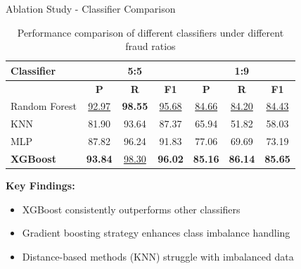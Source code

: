 \documentclass{beamer}
\begin{document}
\begin{frame}{Ablation Study - Classifier Comparison}
    \begin{table}
        \centering
        \tiny
        \caption{Performance comparison of different classifiers under different fraud ratios}
        \begin{tabular}{lccc|ccc}
            \hline
            \textbf{Classifier} & \multicolumn{3}{c|}{\textbf{5:5}} & \multicolumn{3}{c}{\textbf{1:9}} \\
            \hline
             & \textbf{P} & \textbf{R} & \textbf{F1} & \textbf{P} & \textbf{R} & \textbf{F1} \\
            \hline
            Random Forest & \underline{92.97} & \textbf{98.55} & \underline{95.68} & \underline{84.66} & \underline{84.20} & \underline{84.43} \\
            KNN & 81.90 & 93.64 & 87.37 & 65.94 & 51.82 & 58.03 \\
            MLP & 87.82 & 96.24 & 91.83 & 77.06 & 69.69 & 73.19 \\
            \textbf{XGBoost} & \textbf{93.84} & \underline{98.30} & \textbf{96.02} & \textbf{85.16} & \textbf{86.14} & \textbf{85.65} \\
            \hline
        \end{tabular}
    \end{table}
    
    \vspace{0.3cm}
    \textbf{Key Findings:}
    \begin{itemize}
        \item XGBoost consistently outperforms other classifiers
        \item Gradient boosting strategy enhances class imbalance handling
        \item Distance-based methods (KNN) struggle with imbalanced data
    \end{itemize}
\end{frame}
\end{document}
